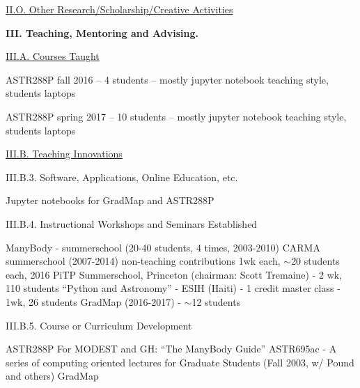 \documentclass[11pt,letterpaper]{article}
\newcommand{\newi}{\newline\indent}
\newcommand{\ap}{$\sim$}
\begin{document}










\underline{II.O. Other Research/Scholarship/Creative Activities}


\textbf{III. Teaching, Mentoring and Advising.}


\underline{III.A. Courses Taught}


ASTR288P fall 2016 --  4 students -- mostly jupyter notebook teaching style, students laptops

ASTR288P spring 2017 -- 10 students -- mostly jupyter notebook teaching style, students laptops


\underline{III.B. Teaching Innovations}


 
III.B.3. Software, Applications, Online Education, etc.

Jupyter notebooks for GradMap and ASTR288P

III.B.4. Instructional Workshops and Seminars Established

ManyBody - summerschool (20-40 students, 4 times, 2003-2010)\newi
CARMA summerschool (2007-2014) non-teaching contributions  1wk each, \ap 20 students each\newi
2009, 2016 PiTP Summerschool, Princeton (chairman: Scott Tremaine) - 2 wk, 110 students\newi
``Python and Astronomy'' - ESIH (Haiti) - 1 credit master class -  1wk, 26 students\newi
GradMap (2016-2017) - \ap 12 students

III.B.5. Course or Curriculum Development

ASTR288P\newi
For MODEST and GH: ``The ManyBody Guide''\newi
ASTR695ac - A series of computing oriented lectures for Graduate Students (Fall 2003, w/ Pound and others)\newi
GradMap \newi


\end{document}
